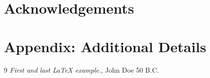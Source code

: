 \documentclass[twocolumn]{article}
\begin{document}
\section*{Acknowledgements}\label{sec:ack}

\appendix
\section{Appendix: Additional Details}\label{sec:appendix}

\begin{thebibliography}{9}
 \emph{First and last \LaTeX{} example.},
John Doe 50 B.C. 
\end{thebibliography}
\end{document}

